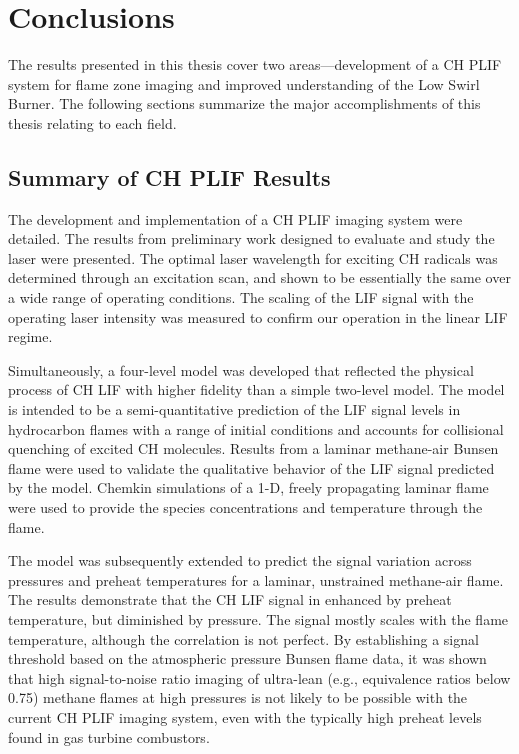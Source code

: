 \chapter{Conclusions}
\label{ch:conclusions}

The results presented in this thesis cover two areas---development of a CH PLIF system for flame zone imaging and improved understanding of the Low Swirl Burner.
The following sections summarize the major accomplishments of this thesis relating to each field.

\section{Summary of CH PLIF Results}

The development and implementation of a CH PLIF imaging system were detailed.
The results from preliminary work designed to evaluate and study the laser were presented.
The optimal laser wavelength for exciting CH radicals was determined through an excitation scan, and shown to be essentially the same over a wide range of operating conditions.
The scaling of the LIF signal with the operating laser intensity was measured to confirm our operation in the linear LIF regime.

Simultaneously, a four-level model was developed that reflected the physical process of CH LIF with higher fidelity than a simple two-level model.
The model is intended to be a semi-quantitative prediction of the LIF signal levels in hydrocarbon flames with a range of initial conditions and accounts for collisional quenching of excited CH molecules.
Results from a laminar methane-air Bunsen flame were used to validate the qualitative behavior of the LIF signal predicted by the model.
Chemkin simulations of a 1-D, freely propagating laminar flame were used to provide the species concentrations and temperature through the flame.

The model was subsequently extended to predict the signal variation across pressures and preheat temperatures for a laminar, unstrained methane-air flame.
The results demonstrate that the CH LIF signal in enhanced by preheat temperature, but diminished by pressure.
The signal mostly scales with the flame temperature, although the correlation is not perfect.
By establishing a signal threshold based on the atmospheric pressure Bunsen flame data, it was shown that high signal-to-noise ratio imaging of ultra-lean (e.g., equivalence ratios below 0.75) methane flames at high pressures is not likely to be possible with the current CH PLIF imaging system, even with the typically high preheat levels found in gas turbine combustors.

